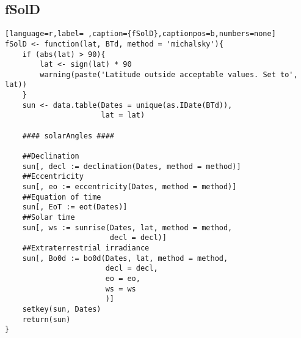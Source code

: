\subsection{fSolD}
\label{sec:org914ce20}
\label{subsec:fsold}
\begin{lstlisting}[language=r,label= ,caption={fSolD},captionpos=b,numbers=none]
fSolD <- function(lat, BTd, method = 'michalsky'){
    if (abs(lat) > 90){
        lat <- sign(lat) * 90
        warning(paste('Latitude outside acceptable values. Set to', lat))
    }
    sun <- data.table(Dates = unique(as.IDate(BTd)),
                      lat = lat)

    #### solarAngles ####

    ##Declination
    sun[, decl := declination(Dates, method = method)]
    ##Eccentricity
    sun[, eo := eccentricity(Dates, method = method)]
    ##Equation of time
    sun[, EoT := eot(Dates)]
    ##Solar time
    sun[, ws := sunrise(Dates, lat, method = method,
                        decl = decl)]
    ##Extraterrestrial irradiance
    sun[, Bo0d := bo0d(Dates, lat, method = method,
                       decl = decl,
                       eo = eo,
                       ws = ws
                       )]
    setkey(sun, Dates)
    return(sun)
}
\end{lstlisting}
